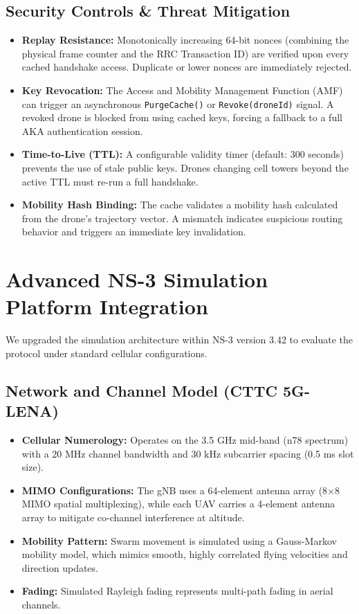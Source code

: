 \documentclass[11pt,a4paper]{article}
\begin{document}
\subsection{Security Controls \& Threat Mitigation}
\begin{itemize}
    \item \textbf{Replay Resistance:} Monotonically increasing 64-bit nonces (combining the physical frame counter and the RRC Transaction ID) are verified upon every cached handshake access. Duplicate or lower nonces are immediately rejected.
    \item \textbf{Key Revocation:} The Access and Mobility Management Function (AMF) can trigger an asynchronous \texttt{PurgeCache()} or \texttt{Revoke(droneId)} signal. A revoked drone is blocked from using cached keys, forcing a fallback to a full AKA authentication session.
    \item \textbf{Time-to-Live (TTL):} A configurable validity timer (default: 300 seconds) prevents the use of stale public keys. Drones changing cell towers beyond the active TTL must re-run a full handshake.
    \item \textbf{Mobility Hash Binding:} The cache validates a mobility hash calculated from the drone's trajectory vector. A mismatch indicates suspicious routing behavior and triggers an immediate key invalidation.
\end{itemize}

\hrulefill

\section{Advanced NS-3 Simulation Platform Integration}

We upgraded the simulation architecture within NS-3 version 3.42 to evaluate the protocol under standard cellular configurations.

\subsection{Network and Channel Model (CTTC 5G-LENA)}
\begin{itemize}
    \item \textbf{Cellular Numerology:} Operates on the 3.5 GHz mid-band (n78 spectrum) with a 20 MHz channel bandwidth and 30 kHz subcarrier spacing (0.5 ms slot size).
    \item \textbf{MIMO Configurations:} The gNB uses a 64-element antenna array (8$\times$8 MIMO spatial multiplexing), while each UAV carries a 4-element antenna array to mitigate co-channel interference at altitude.
    \item \textbf{Mobility Pattern:} Swarm movement is simulated using a Gauss-Markov mobility model, which mimics smooth, highly correlated flying velocities and direction updates.
    \item \textbf{Fading:} Simulated Rayleigh fading represents multi-path fading in aerial channels.
\end{itemize}
\end{document}
